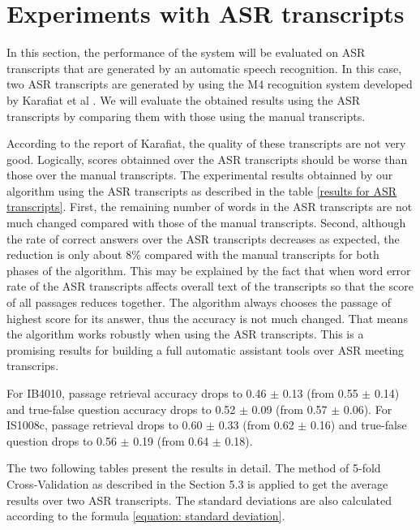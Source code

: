 \section{Experiments with ASR transcripts}

In this section, the performance of the system will be evaluated on ASR transcripts that are generated by an automatic speech recognition. In this case, two ASR transcripts are generated by using the M4 recognition system developed by Karafiat et al \cite{ASR_transcrips}. We will evaluate the obtained results using the ASR transcripts by comparing them with those using the manual transcripts.

According to the report of Karafiat, the quality  of these transcripts are not very good. Logically, scores obtainned over the ASR transcripts should be worse than those over the manual transcripts. The experimental results obtainned by our algorithm using the ASR transcripts as described in the table \ref{results for ASR transcripts}. First, the remaining number of words in the ASR transcripts are not much changed compared with those of the manual transcripts. Second, although the rate of correct answers over the ASR transcripts decreases as expected, the reduction is only about 8\% compared with the manual transcripts for both phases of the algorithm. This may be explained by the fact that when word error rate of the ASR transcripts affects overall text of the transcripts so that the score of all passages reduces together. The algorithm always chooses the passage of highest score for its answer, thus the accuracy is not much changed. That means the algorithm works robustly when using the ASR transcripts. This is a promising results for building a full automatic assistant tools over ASR meeting transcrips. 

For IB4010, passage retrieval accuracy drops to 0.46 \ensuremath{\pm} 0.13 (from 0.55 \ensuremath{\pm} 0.14) and true-false question accuracy drops to 0.52 \ensuremath{\pm} 0.09 (from 0.57 \ensuremath{\pm} 0.06). For IS1008c, passage retrieval drops to 0.60 \ensuremath{\pm} 0.33 (from 0.62 \ensuremath{\pm} 0.16) and true-false question drops to 0.56 \ensuremath{\pm} 0.19 (from 0.64 \ensuremath{\pm} 0.18).

The two following tables present the results in detail. The method of 5-fold Cross-Validation as described in the Section 5.3 is applied to get the average results over two ASR transcripts. The standard deviations are also calculated according to the formula \ref{equation: standard deviation}.

